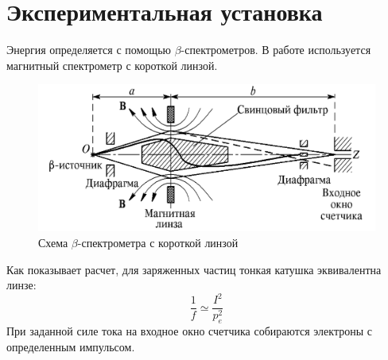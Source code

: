 \documentclass[a4paper, 12pt]{article}
\begin{document}
		\section{Экспериментальная установка}
		Энергия определяется с помощью $\beta$-спектрометров. В работе используется магнитный спектрометр с короткой линзой.
		\begin{figure}[!htb]
			\centering
			\includegraphics[width=0.8\linewidth]{pic2}
			\caption{Схема $\beta$-спектрометра с короткой линзой}
		\end{figure}
		Как показывает расчет, для заряженных частиц тонкая катушка эквивалентна линзе:
		\begin{equation}
			\frac{1}{f} \simeq \frac{I^2}{p_e^2}
		\end{equation}
		При заданной силе тока на входное окно счетчика собираются электроны с определенным импульсом.
\end{document}
